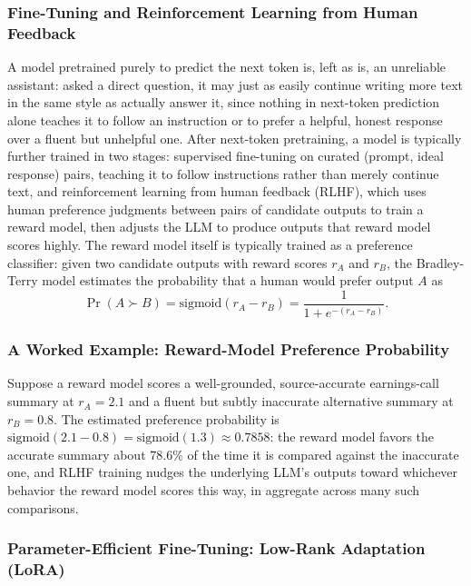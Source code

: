 \documentclass[../ai_in_finance]{subfiles}
\begin{document}
\subsubsection*{Fine-Tuning and Reinforcement Learning from Human Feedback}

A model pretrained purely to predict the next token is, left as is, an unreliable assistant: asked a direct question, it may just as easily continue writing more text in the same style as actually answer it, since nothing in next-token prediction alone teaches it to follow an instruction or to prefer a helpful, honest response over a fluent but unhelpful one. After next-token pretraining, a model is typically further trained in two stages: supervised fine-tuning on curated (prompt, ideal response) pairs,
teaching it to follow instructions rather than merely continue text, and reinforcement learning from human feedback (RLHF), which uses human preference judgments between pairs of candidate outputs to train a reward model, then adjusts the LLM
to produce outputs that reward model scores highly. The reward model itself is typically trained as a preference classifier: given two candidate
outputs with reward scores $r_A$ and $r_B$, the Bradley-Terry model estimates the probability that a human would prefer output $A$ as
$$\Pr(A \succ B) = \text{sigmoid}(r_A - r_B) = \frac{1}{1+e^{-(r_A - r_B)}}.$$

\subsubsection*{A Worked Example: Reward-Model Preference Probability}
Suppose a reward model scores a well-grounded, source-accurate earnings-call summary at $r_A = 2.1$ and a fluent but subtly inaccurate alternative summary at $r_B = 0.8$. The estimated preference probability is $\text{sigmoid}(2.1 - 0.8) = \text{sigmoid}(1.3) \approx 0.7858$: the reward model favors the accurate summary about 78.6\% of the time it is compared against the inaccurate one, and RLHF training nudges the underlying LLM's outputs toward whichever behavior the reward model scores this way, in aggregate across many such comparisons.

\subsubsection*{Parameter-Efficient Fine-Tuning: Low-Rank Adaptation (LoRA)}
\end{document}
